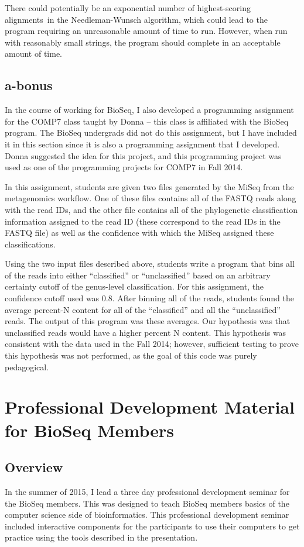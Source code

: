 \documentclass{report}
\begin{document}
There could potentially be an exponential number of highest-scoring alignments~in the Needleman-Wunsch algorithm, which could lead to the program requiring an unreasonable amount of time to run. However, when run with reasonably small strings, the program should complete in an acceptable amount of time.

\subsection{a-bonus}
In the course of working for BioSeq, I also developed a programming assignment for the COMP7 class taught by Donna -- this class is affiliated with the BioSeq program. The BioSeq undergrads did not do this assignment, but I have included it in this section since it is also a programming assignment that I developed. Donna suggested the idea for this project, and this programming project was used as one of the programming projects for COMP7 in Fall 2014.

In this assignment, students are given two files generated by the MiSeq from the metagenomics workflow. One of these files contains all of the FASTQ reads along with the read IDs, and the other file contains all of the phylogenetic classification information assigned to the read ID (these correspond to the read IDs in the FASTQ file) as well as the confidence with which the MiSeq assigned these classifications.

Using the two input files described above, students write a program that bins all of the reads into either ``classified'' or ``unclassified'' based on an arbitrary certainty cutoff of the genus-level classification. For this assignment, the confidence cutoff used was 0.8. After binning all of the reads, students found the average percent-N content for all of the ``classified'' and all the ``unclassified'' reads. The output of this program was these averages. Our hypothesis was that unclassified reads would have a higher percent N content. This hypothesis was consistent with the data used in the Fall 2014; however, sufficient testing to prove this hypothesis was not performed, as the goal of this code was purely pedagogical. 

\section{Professional Development Material for BioSeq Members}
\subsection{Overview}
In the summer of 2015, I lead a three day professional development seminar for the BioSeq members. This was designed to teach BioSeq members basics of the computer science side of bioinformatics. This professional development seminar included interactive components for the participants to use their computers to get practice using the tools described in the presentation.
\end{document}
